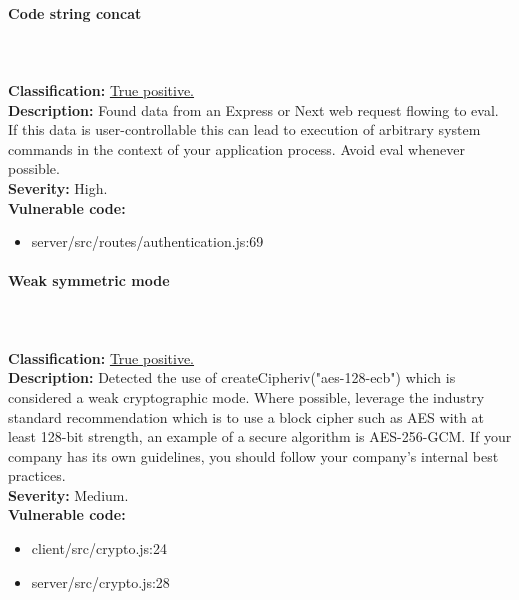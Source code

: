 \documentclass[]{article}
\begin{document}
\paragraph{Code string concat} \mbox{} \\ \\
\textbf{Classification:} \hyperref[subsubsec:improper_neutralization_of_directives_in_dynamically_evaluated_code]{True positive.} \\ 
\textbf{Description:} Found data from an Express or Next web request flowing to eval. If this data is user-controllable this can 
lead to execution of arbitrary system commands in the context of your application process. Avoid eval whenever possible. \\ 
\textbf{Severity:} High. \\ 
\textbf{Vulnerable code:} 
\begin{itemize}
    \item server/src/routes/authentication.js:69
\end{itemize}

\paragraph{Weak symmetric mode} \mbox{} \\ \\
\textbf{Classification:} \hyperref[subsubsec:use_of_a_broken_or_risky_cryptographic_algorithm]{True positive.} \\ 
\textbf{Description:} Detected the use of createCipheriv("aes-128-ecb") which is considered a weak cryptographic mode. Where possible, 
leverage the industry standard recommendation which is to use a block cipher such as AES with at least 128-bit strength, an example 
of a secure algorithm is AES-256-GCM. If your company has its own guidelines, you should follow your company's internal best practices. \\ 
\textbf{Severity:} Medium. \\ 
\textbf{Vulnerable code:} 
\begin{itemize}
    \item client/src/crypto.js:24
    \item server/src/crypto.js:28
\end{itemize}
\end{document}
